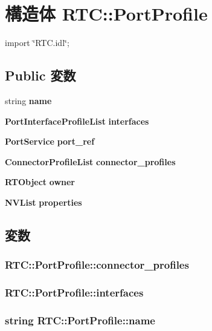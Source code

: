 \section{構造体 RTC::PortProfile}
\label{structRTC_1_1PortProfile}


{\ttfamily import \char`\"{}RTC.idl\char`\"{};}

\subsection*{Public 変数}
\begin{DoxyCompactItemize}
\item 
string {\bf name}
\item 
{\bf PortInterfaceProfileList} {\bf interfaces}
\item 
{\bf PortService} {\bf port\_\-ref}
\item 
{\bf ConnectorProfileList} {\bf connector\_\-profiles}
\item 
{\bf RTObject} {\bf owner}
\item 
{\bf NVList} {\bf properties}
\end{DoxyCompactItemize}


\subsection{変数}
\subsubsection[{connector\_\-profiles}]{ {\bf RTC::PortProfile::connector\_\-profiles}}\label{structRTC_1_1PortProfile_a2222e576d0995c9a84663fb485f24aff}
\subsubsection[{interfaces}]{ {\bf RTC::PortProfile::interfaces}}\label{structRTC_1_1PortProfile_ab9cda86e55b788ed3dc7d793d9849dab}
\subsubsection[{name}]{\setlength{\rightskip}{0pt plus 5cm}string {\bf RTC::PortProfile::name}}\label{structRTC_1_1PortProfile_aad548e10074a048a2d37282d75373d83}
